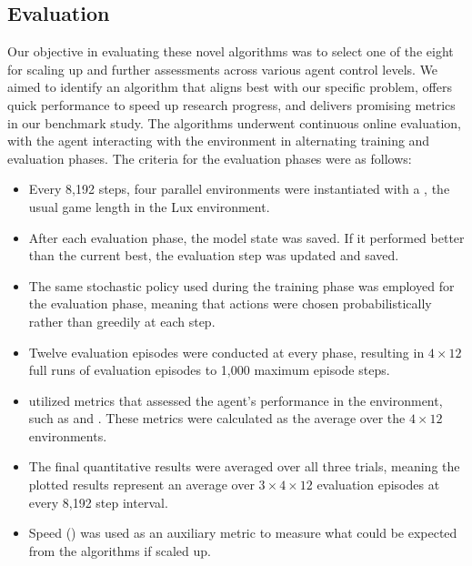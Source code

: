 \subsection{Evaluation}
\label{sec:single-unit-eval}

\noindent Our objective in evaluating these novel algorithms was to select one of the eight for scaling up and further assessments across various agent control levels. We aimed to identify an algorithm that aligns best with our specific problem, offers quick performance to speed up research progress, and delivers promising metrics in our benchmark study. The algorithms underwent continuous online evaluation, with the agent interacting with the environment in alternating training and evaluation phases. The criteria for the evaluation phases were as follows:

\begin{itemize}[itemsep=4pt, parsep=0pt]
    \item Every 8,192 steps, four parallel environments were instantiated with a , the usual game length in the Lux environment.
    
    \item After each evaluation phase, the model state was saved. If it performed better than the current best, the evaluation step was updated and saved.
    
    \item The same stochastic policy used during the training phase was employed for the evaluation phase, meaning that actions were chosen probabilistically rather than greedily at each step.
    
    \item Twelve evaluation episodes were conducted at every phase, resulting in $4 \times 12$ full runs of evaluation episodes to 1,000 maximum episode steps.
    
    \item {} utilized metrics that assessed the agent's performance in the environment, such as  and 
    . These metrics were calculated as the average over the $4 \times 12$ environments.
    
    \item The final quantitative results were averaged over all three trials, meaning the plotted results represent an average over $3 \times 4 \times 12$ evaluation episodes at every 8,192 step interval.
    
    \item Speed () was used as an auxiliary metric to measure what could be expected from the algorithms if scaled up.
\end{itemize}

